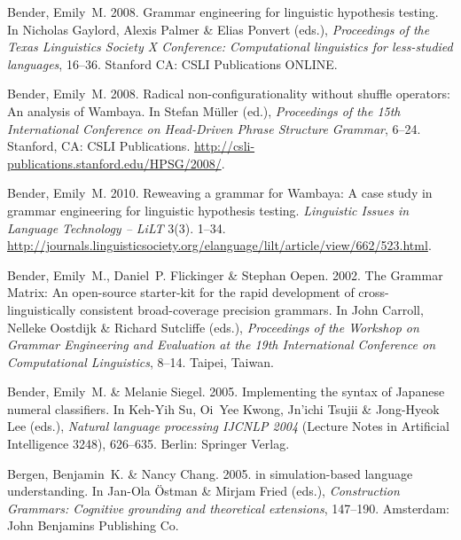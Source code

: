 \begin{thebibliography}{1420}
Bender, Emily~M. 2008{}.
\newblock Grammar engineering for linguistic hypothesis testing.
\newblock In Nicholas Gaylord, Alexis Palmer \& Elias Ponvert (eds.),
  \emph{Proceedings of the {Texas Linguistics Society X Conference}:
  {Computational} linguistics for less-studied languages}, 16--36. Stanford CA:
  CSLI Publications ONLINE.

Bender, Emily~M. 2008{}.
\newblock Radical non-configurationality without shuffle operators: {An}
  analysis of {Wambaya}.
\newblock In Stefan M{\"u}ller (ed.), \emph{Proceedings of the {15th
  International Conference on Head-Driven Phrase Structure Grammar}}, 6--24.
  Stanford, CA: CSLI Publications.
\newblock \urlprefix\url{http://csli-publications.stanford.edu/HPSG/2008/}.

Bender, Emily~M. 2010.
\newblock Reweaving a grammar for {Wambaya}: {A} case study in grammar
  engineering for linguistic hypothesis testing.
\newblock \emph{Linguistic Issues in Language Technology -- LiLT} 3(3). 1--34.
\newblock
  \urlprefix\url{http://journals.linguisticsociety.org/elanguage/lilt/article/view/662/523.html}.

Bender, Emily~M., Daniel~P. Flickinger \& Stephan Oepen. 2002.
\newblock The {Grammar Matrix}: {An} open-source starter-kit for the rapid
  development of cross-linguistically consistent broad-coverage precision
  grammars.
\newblock In John Carroll, Nelleke Oostdijk \& Richard Sutcliffe (eds.),
  \emph{Proceedings of the {Workshop on Grammar Engineering and Evaluation at
  the 19th International Conference on Computational Linguistics}}, 8--14.
  Taipei, Taiwan.

Bender, Emily~M. \& Melanie Siegel. 2005.
\newblock Implementing the syntax of {Japanese} numeral classifiers.
\newblock In Keh-Yih Su, Oi~Yee Kwong, Jn'ichi Tsujii \& Jong-Hyeok Lee (eds.),
  \emph{Natural language processing {IJCNLP 2004}} (Lecture Notes in Artificial
  Intelligence 3248), 626--635. Berlin: Springer Verlag.

Bergen, Benjamin~K. \& Nancy Chang. 2005.
 in simulation-based language
  understanding.
\newblock In Jan-Ola {\"O}stman \& Mirjam Fried (eds.), \emph{{Construction
  Grammars}: {Cognitive} grounding and theoretical extensions}, 147--190.
  Amsterdam: John Benjamins Publishing Co.


\end{thebibliography}
